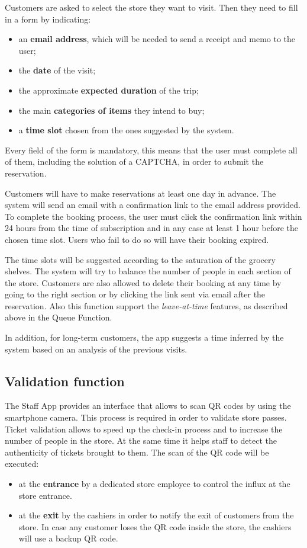 	Customers are asked to select the store they want to visit. Then they need to fill in a form by indicating:
	\begin{itemize}
		\item an \textbf{email address}, which will be needed to send a receipt and memo to the user;
		\item the \textbf{date} of the visit;
		\item the approximate \textbf{expected duration} of the trip;
	 	\item the main \textbf{categories of items} they intend to buy;
	    \item a \textbf{time slot} chosen from the ones suggested by the system.
	\end{itemize}
	Every field of the form is mandatory, this means that the user must complete all of them, including the solution of a CAPTCHA, in order to submit the reservation.

	Customers will have to make reservations at least one day in advance.\newline
	The system will send an email with a confirmation link to the email address provided. To complete the booking process, the user must click the confirmation link within 24 hours from the time of subscription and in any case at least 1 hour before the chosen time slot. Users who fail to do so will have their booking expired.

	The time slots will be suggested according to the saturation of the grocery shelves. The system will try to balance the number of people in each section of the store.\newline
	Customers are also allowed to delete their booking at any time by going to the right section or by clicking the link sent via email after the reservation.
	Also this function support the \textit{leave-at-time} features, as described above in the Queue Function.

	In addition, for long-term customers, the app suggests a time inferred by the system based on an analysis of the previous visits.

\subsection{Validation function}
The Staff App provides an interface that allows to scan QR codes by using the smartphone camera. This process is required in order to validate store passes.\newline
Ticket validation allows to speed up the check-in process and to increase the number of people in the store. At the same time it helps staff to detect the authenticity of tickets brought to them.\newline
The scan of the QR code will be executed:
\begin{itemize}
	\item at the \textbf{entrance} by a dedicated store employee to control the influx at the store entrance.
	\item at the \textbf{exit} by the cashiers in order to notify the exit of customers from the store. In case any customer loses the QR code inside the store, the cashiers will use a backup QR code.
\end{itemize}

